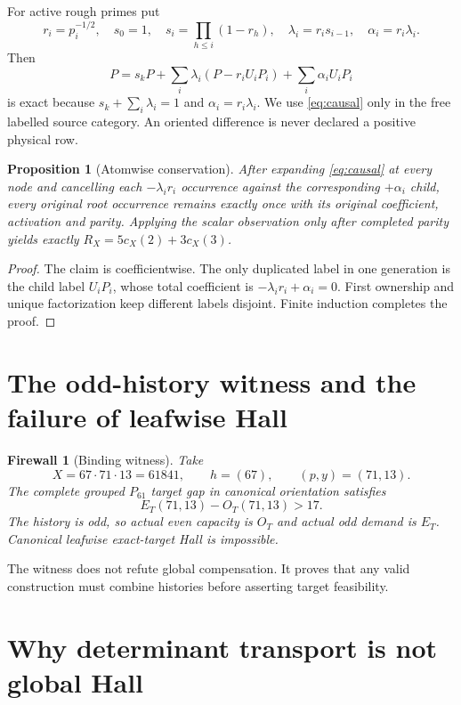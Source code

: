\documentclass[11pt]{article}
\newtheorem{proposition}[theorem]{Proposition}
\newtheorem{firewall}[theorem]{Firewall}
\newcommand{\1}{\mathbf 1}
\begin{document}
For active rough primes put
\[
 r_i=p_i^{-1/2},\quad s_0=1,\quad s_i=\prod_{h\le i}(1-r_h),\quad
 \lambda_i=r_i s_{i-1},\quad\alpha_i=r_i\lambda_i.
\]
Then
\begin{equation}\label{eq:causal}
P=s_kP+\sum_i\lambda_i(P-r_iU_iP_i)+\sum_i\alpha_iU_iP_i
\end{equation}
is exact because $s_k+\sum_i\lambda_i=1$ and $\alpha_i=r_i\lambda_i$. We use \eqref{eq:causal} only in the free labelled source category. An oriented difference is never declared a positive physical row.

\begin{proposition}[Atomwise conservation]\label{prop:atom}
After expanding \eqref{eq:causal} at every node and cancelling each $-\lambda_ir_i$ occurrence against the corresponding $+\alpha_i$ child, every original root occurrence remains exactly once with its original coefficient, activation and parity. Applying the scalar observation only after completed parity yields exactly $R_X=5c_X(2)+3c_X(3)$.
\end{proposition}
\begin{proof}
The claim is coefficientwise. The only duplicated label in one generation is the child label $U_iP_i$, whose total coefficient is $-\lambda_ir_i+\alpha_i=0$. First ownership and unique factorization keep different labels disjoint. Finite induction completes the proof.
\end{proof}

\section{The odd-history witness and the failure of leafwise Hall}

\begin{firewall}[Binding witness]\label{fw:odd}
Take
\[
 X=67\cdot71\cdot13=61841,\qquad h=(67),\qquad(p,y)=(71,13).
\]
The complete grouped $P_{61}$ target gap in canonical orientation satisfies
\[
 E_T(71,13)-O_T(71,13)>17.
\]
The history is odd, so actual even capacity is $O_T$ and actual odd demand is $E_T$. Canonical leafwise exact-target Hall is impossible.
\end{firewall}

The witness does not refute global compensation. It proves that any valid construction must combine histories before asserting target feasibility.

\section{Why determinant transport is not global Hall}
\end{document}
